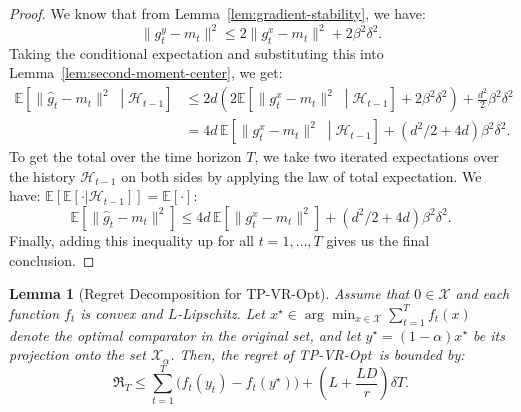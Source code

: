 \documentclass[journal,onecolumn]{IEEEtran}
\newcommand{\cX}{\mathcal{X}}
\theoremstyle{plain}
\newtheorem{lemma}[theorem]{Lemma}
\theoremstyle{definition}
\theoremstyle{remark}
\newcommand{\regret}{\mathfrak{R}}
\newcommand{\tpvr}{{\sc TP-VR-Opt}}
\begin{document}
{\begin{proof}
    We know that from Lemma~\ref{lem:gradient-stability}, we have:
    \begin{equation*}
        \|g_{t}^{y}-m_{t}\|^{2}\le 2\|g_{t}^{x}-m_{t}\|^{2}+ 2\beta^{2}\delta^{2}.
    \end{equation*}
    Taking the conditional expectation and substituting this into Lemma~\ref{lem:second-moment-center},
    we get:
    \begin{align*}
        \mathbb{E}\left[\|\hat g_{t}-m_{t}\|^{2}\;\middle| \mathcal{H}_{t-1}\right] & \le 2d\left( 2\mathbb{E}\left[\|g_{t}^{x}-m_{t}\|^{2}\;\middle| \mathcal{H}_{t-1}\right] + 2\beta^{2}\delta^{2}\right) + \frac{d^{2}}{2}\beta^{2}\delta^{2} \\
        & = 4d\,\mathbb{E}\left[\|g_{t}^{x}-m_{t}\|^{2}\;\middle| \mathcal{H}_{t-1}\right] + (d^{2}/2+4d)\beta^{2}\delta^{2}.
    \end{align*}
    To get the total over the time horizon $T$, we take two iterated expectations over the history $\mathcal{H}_{t-1}$ on both sides by applying the law of total expectation. We have: $\mathbb{E}[\mathbb{E}[\cdot|\mathcal{H}_{t-1}]] = \mathbb{E}[\cdot]$:
    \begin{equation*}
        \mathbb{E}\left[\|\hat g_{t}-m_{t}\|^{2}\right]\le 4d\,\mathbb{E}\left[\|
        g_{t}^{x}-m_{t}\|^{2}\right] + (d^{2}/2+4d)\beta^{2}\delta^{2}.
    \end{equation*}
    Finally, adding this inequality up for all $t=1,\dots,T$ gives us the final conclusion.
\end{proof}

\begin{lemma}[Regret Decomposition for \tpvr]
    \label{lem:regret-decomposition} Assume that $0 \in \cX$ and each function $f_{t}$
    is convex and $L$-Lipschitz. Let
    $x^{\star}\in \arg\min_{x\in \cX}\sum_{t=1}^{T}f_{t}(x)$ denote the optimal
    comparator in the original set, and let $y^{\star}= (1-\alpha)x^{\star}$ be
    its projection onto the set $\cX_{\alpha}$. Then, the regret of \tpvr\, is bounded by:
    \begin{equation}
        \regret_{T}\le \sum_{t=1}^{T}\big(f_{t}(y_{t})-f_{t}(y^{\star})\big)+\left(L+\frac{LD}{r}\right)\delta T. \label{eq:regret-reduce}
    \end{equation}
\end{lemma}

}
\end{document}

